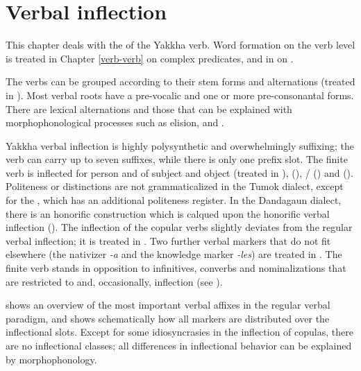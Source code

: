 \chapter{Verbal inflection}\label{verbalmorph}

This chapter deals with the  of the Yakkha verb. Word formation on the verb level is treated in  Chapter \ref{verb-verb} on complex predicates, and in  on .

The verbs can be grouped according to their stem forms and alternations (treated in ). Most verbal roots have a pre-vocalic and one or more pre-consonantal  forms. There are lexical alternations and those that can be explained with morphophonological processes such as elision,  and . 

Yakkha verbal inflection is highly polysynthetic and overwhelmingly suffixing; the verb can carry up to seven suffixes, while there is only one prefix slot. The finite verb is  inflected for person and  of subject and object (treated in ),  (),  / () and   (). Politeness or  distinctions are not grammaticalized in the Tumok dialect, except for the , which has an additional politeness register. In the Dandagaun dialect,  there is an honorific construction which is calqued upon the  honorific verbal inflection  (). The inflection of the copular verbs slightly deviates from the regular verbal inflection; it is treated in . Two further verbal markers that do not fit elsewhere (the nativizer \emph{-a} and the knowledge marker \emph{-les})  are treated in . The finite verb stands in opposition to infinitives, converbs and nominalizations that are restricted to  and, occasionally,  inflection (see ). 



 shows an overview of the most important verbal affixes in the regular verbal paradigm, and  shows schematically how all  markers are distributed over the inflectional slots. Except for some idiosyncrasies in the inflection of copulas, there are no inflectional classes; all differences in inflectional behavior can be explained by morphophonology. 


